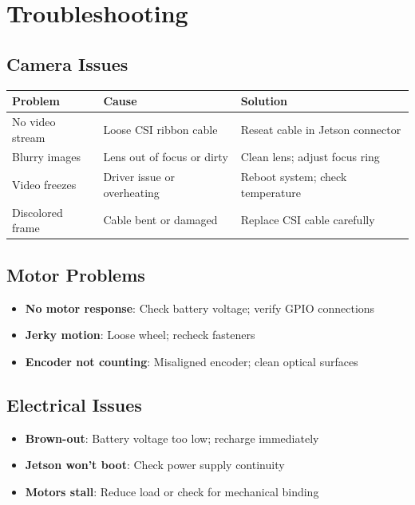 %
%

\chapter{Troubleshooting}

\section{Camera Issues}

\begin{tabular}{|p{4cm}|p{4cm}|p{5cm}|}
\hline
\textbf{Problem} & \textbf{Cause} & \textbf{Solution} \\
\hline
No video stream & Loose CSI ribbon cable & Reseat cable in Jetson connector \\
\hline
Blurry images & Lens out of focus or dirty & Clean lens; adjust focus ring \\
\hline
Video freezes & Driver issue or overheating & Reboot system; check temperature \\
\hline
Discolored frame & Cable bent or damaged & Replace CSI cable carefully \\
\hline
\end{tabular}

\section{Motor Problems}

\begin{itemize}
    \item \textbf{No motor response}: Check battery voltage; verify GPIO connections
    \item \textbf{Jerky motion}: Loose wheel; recheck fasteners
    \item \textbf{Encoder not counting}: Misaligned encoder; clean optical surfaces
\end{itemize}

\section{Electrical Issues}

\begin{itemize}
    \item \textbf{Brown-out}: Battery voltage too low; recharge immediately
    \item \textbf{Jetson won't boot}: Check power supply continuity
    \item \textbf{Motors stall}: Reduce load or check for mechanical binding
\end{itemize}







